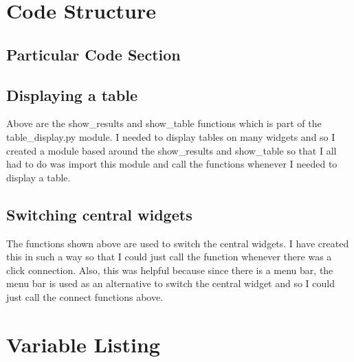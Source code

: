 \section{Code Structure}

\subsection{Particular Code Section}

\subsection{Displaying a table}
\begin{figure}[H]
\end{figure}

Above are the show\_results and show\_table functions which is part of the table\_display.py module. I needed to display tables on many widgets and so I created a module based around the show\_results and show\_table so that I all had to do was import this module and call the functions whenever I needed to display a table.

\subsection{Switching central widgets}
\begin{figure}[H]
\end{figure}
The functions shown above are used to switch the central widgets. I have created this in such a way so that I could just call the function whenever there was a click connection. Also, this was helpful because since there is a menu bar, the menu bar is used as an alternative to switch the central widget and so I could just call the connect functions above. 
\section{Variable Listing}

